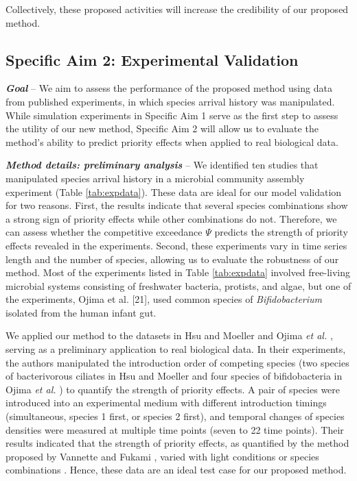 \documentclass[12pt, class=article, crop=false]{standalone}
\begin{document}
Collectively, these proposed activities will increase the credibility of our proposed method.

\subsection*{Specific Aim 2: Experimental Validation}

\textbf{\textit{Goal}} -- 
We aim to assess the performance of the proposed method using data from published experiments, in which species arrival history was manipulated.
While simulation experiments in Specific Aim 1 serve as the first step to assess the utility of our new method, Specific Aim 2 will allow us to evaluate the method's ability to predict priority effects when applied to real biological data.

\textit{\textbf{Method details: preliminary analysis}} --
We identified ten studies that manipulated species arrival history in a microbial community assembly experiment (Table \ref{tab:expdata}).
These data are ideal for our model validation for two reasons.
First, the results indicate that several species combinations show a strong sign of priority effects while other combinations do not.
Therefore, we can assess whether the competitive exceedance $\Psi$ predicts the strength of priority effects revealed in the experiments.
Second, these experiments vary in time series length and the number of species, allowing us to evaluate the robustness of our method. 
Most of the experiments listed in Table \ref{tab:expdata} involved free-living microbial systems consisting of freshwater bacteria, protists, and algae, but one of the experiments, Ojima et al. [21], used common species of \textit{Bifidobacterium} isolated from the human infant gut. 

We applied our method to the datasets in Hsu and Moeller \citep{hsu_metabolic_2021} and Ojima \textit{et al.} \citep{ojima_priority_2022}, serving as a preliminary application to real biological data.
In their experiments, the authors manipulated the introduction order of competing species (two species of bacterivorous ciliates in Hsu and Moeller \citep{hsu_metabolic_2021} and four species of bifidobacteria in Ojima \textit{et al.} \citep{ojima_priority_2022}) to quantify the strength of priority effects.
A pair of species were introduced into an experimental medium with different introduction timings (simultaneous, species 1 first, or species 2 first), and temporal changes of species densities were measured at multiple time points (seven to 22 time points).
Their results indicated that the strength of priority effects, as quantified by the method proposed by Vannette and Fukami \citep{vannette_historical_2014}, varied with light conditions \citep{hsu_metabolic_2021} or species combinations \citep{ojima_priority_2022}.
Hence, these data are an ideal test case for our proposed method.
\end{document}
